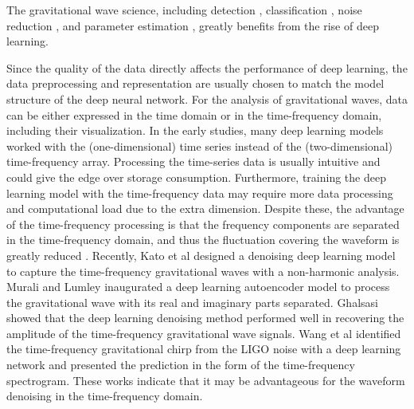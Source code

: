 \documentclass[preprint,12pt]{elsarticle}
\begin{document}
The gravitational wave science, including detection \cite{george2018deep, george2018paraest, li2020some, krastev2021detection, mishra2021optimization, jiang2022convolutional, ma2022ensemble, nousi2023deep, qiu2023deep, jadhav2023towards, zhao2023space, bini2023autoencoder, chatterjee2024pre}, classification \cite{razzano2018image, krastev2021detection, lopac2021detection, murali2023detecting, qiu2023deep, sasaoka2024comparative}, noise reduction \cite{shen2019denoising, wei2020gravitational, chatterjee2021extraction, kato2022validation, 
bacon2023denoising, ghalsasi2023amplifying, jadhav2023towards, zhao2023space, murali2023detecting, wang2024waveformer, ma2025extraction}, and parameter estimation \cite{george2018paraest, green2020gravitational, gabbard2022bayesian}, greatly benefits from the rise of deep learning.

Since the quality of the data directly affects the performance of deep learning, the data preprocessing and representation are usually chosen to match the model structure of the deep neural network.
For the analysis of gravitational waves, data can be either expressed in the time domain or in the time-frequency domain, including their visualization.
In the early studies, many deep learning models worked with the (one-dimensional) time series instead of the (two-dimensional) time-frequency array.
Processing the time-series data is usually intuitive and could give the edge over storage consumption.
Furthermore, training the deep learning model with the time-frequency data may require more data processing and computational load due to the extra dimension. 
Despite these, the advantage of the time-frequency processing is that the frequency components are separated in the time-frequency domain, and thus the fluctuation covering the waveform is greatly reduced \cite{murali2023detecting}. 
Recently, Kato et al \cite{kato2022validation} designed a denoising deep learning model to capture the time-frequency gravitational waves with a non-harmonic analysis. 
Murali and Lumley \cite{murali2023detecting} inaugurated a deep learning autoencoder model to process the gravitational wave with its real and imaginary parts separated. 
Ghalsasi \cite{ghalsasi2023amplifying} showed that the deep learning denoising method performed well in recovering the amplitude of the time-frequency gravitational wave signals. 
Wang et al \cite{wang2024rapid} identified the time-frequency gravitational chirp from the LIGO noise with a deep learning network and presented the prediction in the form of the time-frequency spectrogram. 
These works indicate that it may be advantageous for the waveform denoising in the time-frequency domain. 
\end{document}
